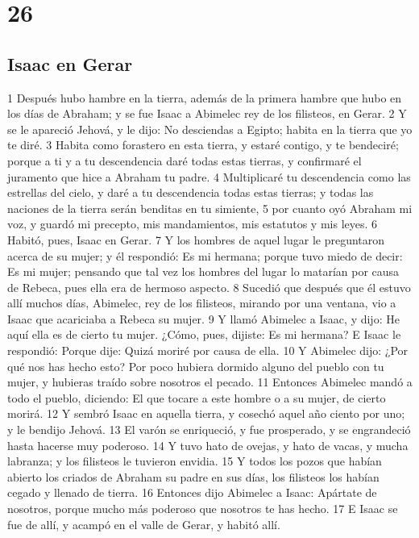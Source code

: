 \chapter{26}

\section{Isaac en Gerar}

1 Después hubo hambre en la tierra, además de la primera hambre que hubo en los días de Abraham; y se fue Isaac a Abimelec rey de los filisteos, en Gerar.
2 Y se le apareció Jehová, y le dijo: No desciendas a Egipto; habita en la tierra que yo te diré.
3 Habita como forastero en esta tierra, y estaré contigo, y te bendeciré; porque a ti y a tu descendencia daré todas estas tierras, y confirmaré el juramento que hice a Abraham tu padre.
4 Multiplicaré tu descendencia como las estrellas del cielo, y daré a tu descendencia todas estas tierras; y todas las naciones de la tierra serán benditas en tu simiente,
5 por cuanto oyó Abraham mi voz, y guardó mi precepto, mis mandamientos, mis estatutos y mis leyes.
6 Habitó, pues, Isaac en Gerar.
7 Y los hombres de aquel lugar le preguntaron acerca de su mujer; y él respondió: Es mi hermana; porque tuvo miedo de decir: Es mi mujer; pensando que tal vez los hombres del lugar lo matarían por causa de Rebeca, pues ella era de hermoso aspecto.
8 Sucedió que después que él estuvo allí muchos días, Abimelec, rey de los filisteos, mirando por una ventana, vio a Isaac que acariciaba a Rebeca su mujer.
9 Y llamó Abimelec a Isaac, y dijo: He aquí ella es de cierto tu mujer. ¿Cómo, pues, dijiste: Es mi hermana? E Isaac le respondió: Porque dije: Quizá moriré por causa de ella.
10 Y Abimelec dijo: ¿Por qué nos has hecho esto? Por poco hubiera dormido alguno del pueblo con tu mujer, y hubieras traído sobre nosotros el pecado.
11 Entonces Abimelec mandó a todo el pueblo, diciendo: El que tocare a este hombre o a su mujer, de cierto morirá.
12 Y sembró Isaac en aquella tierra, y cosechó aquel año ciento por uno; y le bendijo Jehová.
13 El varón se enriqueció, y fue prosperado, y se engrandeció hasta hacerse muy poderoso.
14 Y tuvo hato de ovejas, y hato de vacas, y mucha labranza; y los filisteos le tuvieron envidia.
15 Y todos los pozos que habían abierto los criados de Abraham su padre en sus días, los filisteos los habían cegado y llenado de tierra.
16 Entonces dijo Abimelec a Isaac: Apártate de nosotros, porque mucho más poderoso que nosotros te has hecho.
17 E Isaac se fue de allí, y acampó en el valle de Gerar, y habitó allí.
